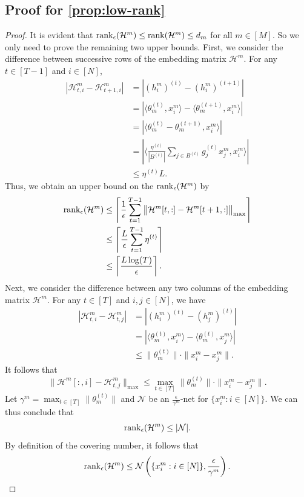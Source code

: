 \subsection{Proof for \autoref{prop:low-rank}}
\begin{proof}
    It is evident that $\operatorname{rank}_\epsilon(\mathcal{H}^m) \leq \operatorname{rank}(\mathcal{H}^m) \leq d_m$ for all $m \in [M]$. So we only need to prove the remaining two upper bounds. First, we consider the difference between successive rows of the embedding matrix $\mathcal{H}^m$. For any $t \in [T-1]$ and $i \in [N]$, 
    \begin{align*}
        |\mathcal{H}^m_{t, i} - \mathcal{H}^m_{t+1, i}| &= |(h_i^m)^{(t)} - (h_i^m)^{(t+1)}|
        \\&= |\langle \theta_m^{(t)}, x^m_i\rangle - \langle \theta_m^{(t+1)}, x^m_i\rangle|
        \\&= |\langle \theta_m^{(t)} - \theta_m^{(t+1)}, x^m_i\rangle|
        \\&= \left|\langle \frac{\eta^{(t)}}{|B^{(t)}|}\sum_{j\in B^{(t)}} g_j^{(t)} x_j^m , x^m_i\rangle\right|
        \\&\leq \eta^{(t)}L.
    \end{align*}
    Thus, we obtain an upper bound on the $\operatorname{rank}_\epsilon(\mathcal{H}^m)$ by 
    \begin{align*}
        \operatorname{rank}_\epsilon(\mathcal{H}^m) &\leq \left\lceil \frac{1}{\epsilon} \sum_{t=1}^{T-1} \big\|\mathcal{H}^m[t,:] - \mathcal{H}^m[t+1, :]\big\|_{\max} \right\rceil \\
        &\leq \left\lceil \frac{L}{\epsilon} \sum_{t=1}^{T-1}\eta^{(t)} \right\rceil\\
        &\leq \left\lceil \frac{L\log(T)}{\epsilon} \right\rceil.
    \end{align*}
    Next, we consider the difference between any two columns of the embedding matrix $\mathcal{H}^m$. For any $t \in [T]$ and $i,j\in[N]$, we have 
    \begin{align*}
        |\mathcal{H}^m_{t, i} - \mathcal{H}^m_{t, j}| &= |(h_i^m)^{(t)} - (h_j^m)^{(t)}|
        \\&= |\langle \theta_m^{(t)}, x^m_i\rangle - \langle \theta_m^{(t)}, x^m_j\rangle|
        \\&\leq \|\theta_m^{(t)}\|\cdot\|x^m_i - x^m_j\|.
    \end{align*}
    It follows that 
    \[\|\mathcal{H}^m[:,i] - \mathcal{H}^m_{t, j}\|_{\max} \leq \max_{t \in [T]}\|\theta_m^{(t)}\|\cdot\|x^m_i - x^m_j\|.\]
    Let $\gamma^m = \max_{t \in [T]}\|\theta_m^{(t)}\|$ and $\mathcal{N}$ be an $\frac{\epsilon}{\gamma^m}$-net for $\{x^m_i : i \in [N]\}$. We can thus conclude that 
    \[\operatorname{rank}_\epsilon(\mathcal{H}^m) \leq |\mathcal{N}|.\]
    By definition of the covering number, it follows that 
    \[\operatorname{rank}_{\epsilon}(\mathcal{H}^m) \leq \mathcal{N}\left(\{x^m_i: i \in [N]\}, \frac{\epsilon}{\gamma^m}\right).\]
\end{proof}

